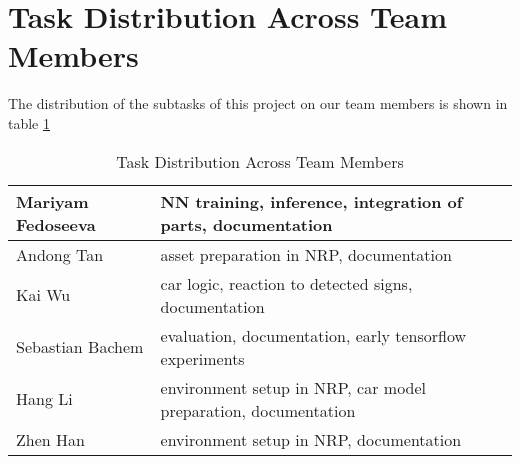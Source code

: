 \section{Task Distribution Across Team Members}

The distribution of the subtasks of this project on our team members is shown in table \ref{tab:task_distrubution}

\begin{table}[htpb]
    \caption[Task Distribution Across Team Members]{Task Distribution Across Team Members}
    \label{tab:task_distrubution}
    \centering
    \begin{tabular}{|l|l|}
    \hline
    Mariyam Fedoseeva   & NN training, inference, integration of parts, documentation \\
    \hline
    Andong Tan          & asset preparation in NRP, documentation \\
    \hline
    Kai Wu              & car logic, reaction to detected signs, documentation \\
    \hline
    Sebastian Bachem    & evaluation, documentation, early tensorflow experiments \\
    \hline
    Hang Li             & environment setup in NRP, car model preparation, documentation \\
    \hline
    Zhen Han            & environment setup in NRP, documentation\\
    \hline
    \end{tabular}
\end{table}
